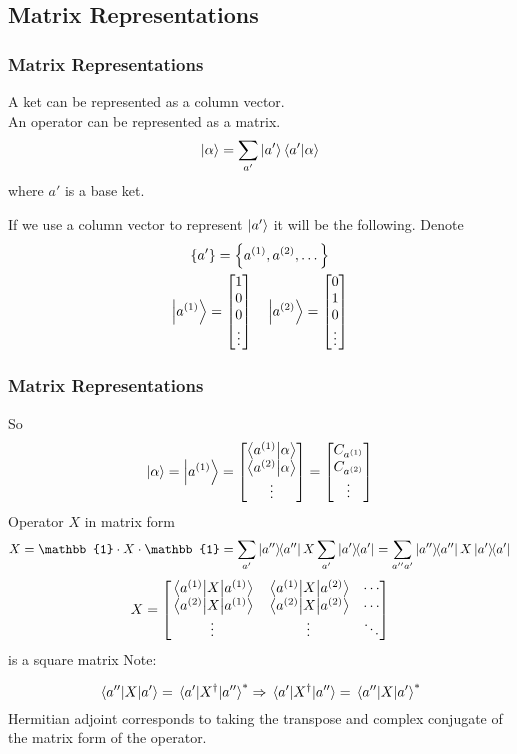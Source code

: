 \subsection{Matrix Representations}
\begin{frame}
	\frametitle{Matrix Representations}
	A ket can be represented as a column vector.\\
	An operator can be represented as a matrix.
	\[
		\ket \alpha = \sum_{a'} \ket{a'} \ip{a'}{\alpha}
	\]
	where $a'$ is a base ket.

	If we use a column vector to represent $\ket{a'}$ it will be the following. Denote
	\begin{gather*}
		\qty{a'} = \qty{a^{(1)},a^{(2)},\dots}\\
		\ket{a^{(1)}} = \mqty[1 \\ 0 \\ 0 \\ \vdots] \quad \ket{a^{(2)}} = \mqty[0 \\ 1 \\ 0 \\ \vdots]
	\end{gather*}

\end{frame}
\begin{frame}
	\frametitle{Matrix Representations}

	So
	\[
		\ket{\alpha} = \ket{a^{(1)}} = \mqty[\ip{a^{(1)}}{\alpha} \\ \ip{a^{(2)}}{\alpha} \\ \vdots] = \mqty[C_{a^{(1)}}\\C_{a^{(2)}}\\ \vdots]
	\]
	Operator $X$ in matrix form
	\[
		X = \mathbb{1} \cdot X \cdot \mathbb{1} = \sum_{a'} \op{a''} X\sum_{a'} \op{a'}  = \sum_{a'' a'} \op{a''} X \op{a'}
	\]
	\[
		X = \mqty[
			\ev{X}{a^{(1)}} & \mel{a^{(1)}}{X}{a^{(2)}} & \cdots \\
			\mel{a^{(2)}}{X}{a^{(1)}} & \ev{X}{a^{(2)}} & \cdots \\
			\vdots & \vdots & \ddots
		]
	\]
	is a square matrix
	Note:

	\[
		\mel{a'' }{X}{a'} = \mel{a'}{X^\dag}{a''}^* \Rightarrow \mel{a'}{X^\dag}{a''} = \mel{a''}{X}{a'}^*
	\]
	Hermitian adjoint corresponds to taking the transpose and complex conjugate of the matrix form of the operator.
\end{frame}

